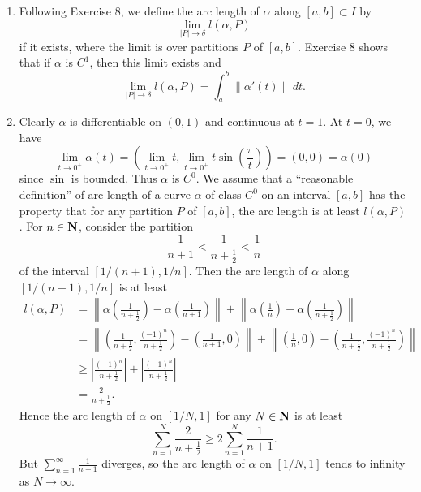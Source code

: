 \begin{ex}
\begin{enumerate}
\item Following Exercise 8, we define the arc length of $\alpha$ along $[a, b] \subset I$ by \[\lim_{|P|\to\delta}l(\alpha, P)\] if it exists, where the limit is over partitions $P$ of $[a, b]$. Exercise 8 shows that if $\alpha$ is $C^1$, then this limit exists and \[\lim_{|P|\to\delta}l(\alpha, P) = \int_a^b\|\alpha'(t)\|\,dt.\]

\item Clearly $\alpha$ is differentiable on $(0, 1)$ and continuous at $t = 1$. At $t = 0$, we have \[\lim_{t\to 0^+}\alpha(t) = \left(\lim_{t\to 0^+}t, \lim_{t\to 0^+}t\sin\left(\frac{\pi}{t}\right)\right) = (0, 0) = \alpha(0)\] since $\sin$ is bounded. Thus $\alpha$ is $C^0$. We assume that a ``reasonable definition'' of arc length of a curve $\alpha$ of class $C^0$ on an interval $[a, b]$ has the property that for any partition $P$ of $[a, b]$, the arc length is at least $l(\alpha, P)$. For $n \in \mathbf{N}$, consider the partition \[\frac{1}{n+1} < \frac{1}{n+\frac{1}{2}} < \frac{1}{n}\] of the interval $[1/(n+1), 1/n]$. Then the arc length of $\alpha$ along $[1/(n+1), 1/n]$ is at least
\begin{align*}
l(\alpha, P) & = \left\|\alpha\left(\frac{1}{n+\frac{1}{2}}\right) - \alpha\left(\frac{1}{n+1}\right)\right\| + \left\|\alpha\left(\frac{1}{n}\right) - \alpha\left(\frac{1}{n+\frac{1}{2}}\right)\right\|\\
& = \left\|\left(\frac{1}{n+\frac{1}{2}}, \frac{(-1)^n}{n+\frac{1}{2}}\right) - \left(\frac{1}{n + 1}, 0\right)\right\| + \left\|\left(\frac{1}{n}, 0\right) - \left(\frac{1}{n+\frac{1}{2}}, \frac{(-1)^n}{n+\frac{1}{2}}\right)\right\|\\
& \geq \left|\frac{(-1)^n}{n+\frac{1}{2}}\right| + \left|\frac{(-1)^n}{n+\frac{1}{2}}\right|\\
& = \frac{2}{n+\frac{1}{2}}.
\end{align*}
Hence the arc length of $\alpha$ on $[1/N, 1]$ for any $N \in \mathbf{N}$ is at least \[\sum_{n = 1}^N\frac{2}{n+\frac{1}{2}} \geq 2\sum_{n = 1}^N\frac{1}{n+1}.\] But $\sum_{n = 1}^{\infty}\frac{1}{n+1}$ diverges, so the arc length of $\alpha$ on $[1/N, 1]$ tends to infinity as $N\to\infty$.
\end{enumerate}
\end{ex}


